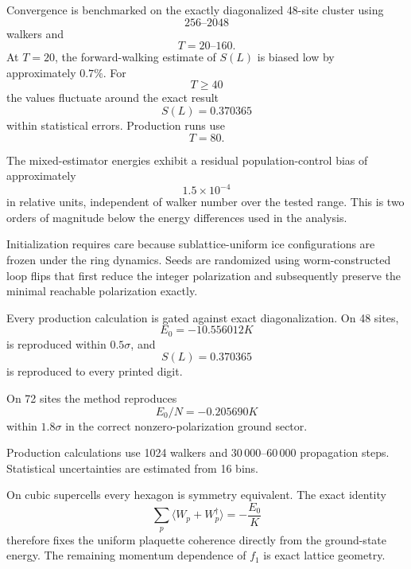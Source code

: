 \documentclass[
aps,
prl,
onecolumn,
amsmath,
amssymb,
superscriptaddress,
longbibliography
]{revtex4-2}
\begin{document}
Convergence is benchmarked on the exactly diagonalized 48-site
cluster using
\begin{equation}
256\text{--}2048
\end{equation}
walkers and
\begin{equation}
T=20\text{--}160.
\end{equation}
At $T=20$, the forward-walking estimate of $S(L)$ is biased low by
approximately $0.7\%$.
For
\begin{equation}
T\ge40
\end{equation}
the values fluctuate around the exact result
\begin{equation}
S(L)=0.370365
\end{equation}
within statistical errors.
Production runs use
\begin{equation}
T=80.
\end{equation}

The mixed-estimator energies exhibit a residual population-control
bias of approximately
\begin{equation}
1.5\times10^{-4}
\end{equation}
in relative units, independent of walker number over the tested
range.
This is two orders of magnitude below the energy differences used in
the analysis.

Initialization requires care because sublattice-uniform ice
configurations are frozen under the ring dynamics.
Seeds are randomized using worm-constructed loop flips that first
reduce the integer polarization and subsequently preserve the minimal
reachable polarization exactly.

Every production calculation is gated against exact diagonalization.
On 48 sites,
\begin{equation}
E_0=-10.556012K
\end{equation}
is reproduced within $0.5\sigma$, and
\begin{equation}
S(L)=0.370365
\end{equation}
is reproduced to every printed digit.

On 72 sites the method reproduces
\begin{equation}
E_0/N=-0.205690K
\end{equation}
within $1.8\sigma$ in the correct nonzero-polarization ground sector.

Production calculations use 1024 walkers and
$30\,000$--$60\,000$ propagation steps.
Statistical uncertainties are estimated from 16 bins.

On cubic supercells every hexagon is symmetry equivalent.
The exact identity
\begin{equation}
\sum_p
\langle
W_p+W_p^\dagger
\rangle
=
-\frac{E_0}{K}
\end{equation}
therefore fixes the uniform plaquette coherence directly from the
ground-state energy.
The remaining momentum dependence of $f_1$ is exact lattice geometry.
\end{document}

